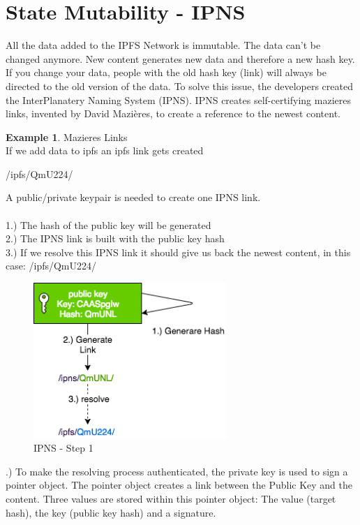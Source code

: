 \documentclass[a4paper,11pt, oneside]{report}
\theoremstyle{definition}
\newtheorem{exmp}{Example}[subsection]
\begin{document}
\newpage
\section{State Mutability - IPNS}
All the data added to the IPFS Network is immutable. The data can't be changed anymore. New content generates new data and therefore a new hash key. If you change your data, people with the old hash key (link) will always be directed to the old version of the data. To solve this issue, the developers created the InterPlanatery Naming System (IPNS). IPNS creates self-certifying mazieres links, invented by David Mazières, to create a reference to the newest content.
\begin{exmp}{Mazieres Links}\\
If we add data to ipfs an ipfs link gets created
\begin{center}
	/ipfs/QmU224/
\end{center}
A public/private keypair is needed to create one IPNS link.\\ \\
1.) The hash of the public key will be generated\\
2.) The IPNS link is built with the public key hash\\
3.) If we resolve this IPNS link it should give us back the newest content, in this case: /ipfs/QmU224/
\begin{figure}[H]
\centering
\includegraphics[width=0.65\textwidth]{img/ipns-1.png}
\caption[IPNS Step 1]{IPNS - Step 1}
\end{figure}
\newpage
{}.) To make the resolving process authenticated, the private key is used to sign a pointer object. The pointer object creates a link between the Public Key and the content. Three values are stored within this pointer object: The value (target hash), the key (public key hash) and a signature.\\

\end{exmp}
\end{document}
